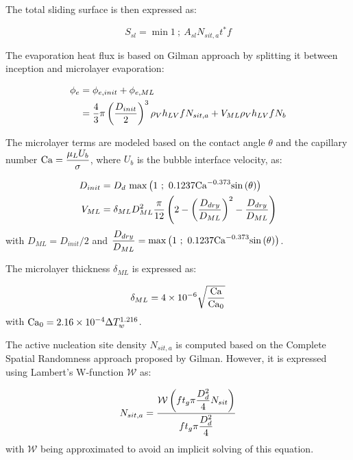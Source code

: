 \npar

The total sliding surface is then expressed as:

\begin{equation}
S_{sl} = \min{1\ ;\ A_{sl}N_{sit,a}t^{*}f}
\end{equation}

The evaporation heat flux is based on Gilman approach by splitting it between inception and microlayer evaporation:

\begin{align}
\phi_{e} &= \phi_{e,init} + \phi_{e,ML} \\
&= \frac{4}{3}\pi \left( \frac{D_{init}}{2} \right)^{3}\rho_{V} h_{LV} f N_{sit,a} + V_{ML} \rho_{V} h_{LV} f N_{b}
\end{align}


The microlayer terms are modeled based on the contact angle $\theta$ and the capillary number $\mathrm{Ca} = \dfrac{\mu_{L} U_{b}}{\sigma}$, where $U_{b}$ is the bubble interface velocity, as:

\begin{align}
D_{init} &= D_{d}~ \mathrm{max}\left( 1\ ;\ 0.1237\mathrm{Ca}^{-0.373}\mathrm{sin}\left( \theta \right) \right)\\
V_{ML} &= \delta_{ML}D_{ML}^{2} \frac{\pi}{12} \left( 2 - \left( \frac{D_{dry}}{D_{ML}} \right)^{2} - \frac{D_{dry}}{D_{ML}} \right)
\end{align}
with $D_{ML} = D_{init} / 2$ and $\dfrac{D_{dry}}{D_{ML}} = \max{1\ ;\ 0.1237\Ca^{-0.373}\sin{\theta}}$.

\npar

The microlayer thickness $\delta_{ML}$ is expressed as:

\begin{equation}
\delta_{ML}= 4 \times 10^{-6} \sqrt{\frac{\mathrm{Ca}}{\mathrm{Ca}_{0}}}
\end{equation}
with $\mathrm{Ca}_{0} = 2.16 \times 10^{-4} \Delta T_{w}^{1.216}$.


\npar

The active nucleation site density $N_{sit,a}$ is computed based on the Complete Spatial Randomness approach proposed by Gilman. However, it is expressed using Lambert's W-function $\mathcal{W}$ as:

\begin{equation}
N_{sit,a} = \frac{\mathcal{W}\left( f t_{g} \pi \dfrac{D_{d}^{2}}{4} N_{sit} \right)}{f t_{g} \pi \dfrac{D_{d}^{2}}{4}}
\end{equation}
with $\mathcal{W}$ being approximated to avoid an implicit solving of this equation.

\npar


